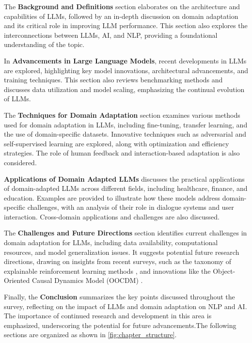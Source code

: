 The \textbf{Background and Definitions} section elaborates on the architecture and capabilities of LLMs, followed by an in-depth discussion on domain adaptation and its critical role in improving LLM performance. This section also explores the interconnections between LLMs, AI, and NLP, providing a foundational understanding of the topic.



In \textbf{Advancements in Large Language Models}, recent developments in LLMs are explored, highlighting key model innovations, architectural advancements, and training techniques. This section also reviews benchmarking methods and discusses data utilization and model scaling, emphasizing the continual evolution of LLMs.



The \textbf{Techniques for Domain Adaptation} section examines various methods used for domain adaptation in LLMs, including fine-tuning, transfer learning, and the use of domain-specific datasets. Innovative techniques such as adversarial and self-supervised learning are explored, along with optimization and efficiency strategies. The role of human feedback and interaction-based adaptation is also considered.



\textbf{Applications of Domain Adapted LLMs} discusses the practical applications of domain-adapted LLMs across different fields, including healthcare, finance, and education. Examples are provided to illustrate how these models address domain-specific challenges, with an analysis of their role in dialogue systems and user interaction. Cross-domain applications and challenges are also discussed.



The \textbf{Challenges and Future Directions} section identifies current challenges in domain adaptation for LLMs, including data availability, computational resources, and model generalization issues. It suggests potential future research directions, drawing on insights from recent surveys, such as the taxonomy of explainable reinforcement learning methods \cite{qing2023surveyexplainablereinforcementlearning}, and innovations like the Object-Oriented Causal Dynamics Model (OOCDM) \cite{yu2024learningcausaldynamicsmodels}.



Finally, the \textbf{Conclusion} summarizes the key points discussed throughout the survey, reflecting on the impact of LLMs and domain adaptation on NLP and AI. The importance of continued research and development in this area is emphasized, underscoring the potential for future advancements.The following sections are organized as shown in \autoref{fig:chapter_structure}.







